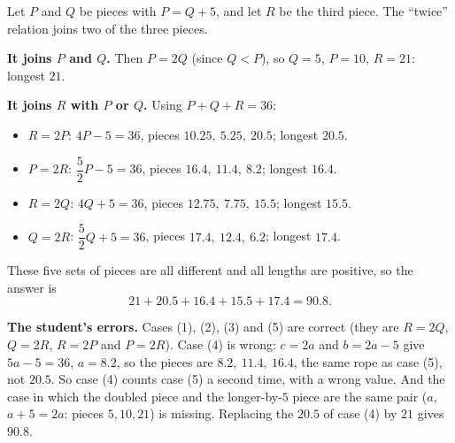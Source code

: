 Let $P$ and $Q$ be pieces with $P=Q+5$, and let $R$ be the third piece. The ``twice'' relation joins two of the three pieces.

\textbf{It joins $P$ and $Q$.} Then $P=2Q$ (since $Q<P$), so $Q=5$, $P=10$, $R=21$: longest $21$.

\textbf{It joins $R$ with $P$ or $Q$.} Using $P+Q+R=36$:
\begin{itemize}
\item $R=2P$: $4P-5=36$, pieces $10.25,\ 5.25,\ 20.5$; longest $20.5$.
\item $P=2R$: $\dfrac{5}{2}P-5=36$, pieces $16.4,\ 11.4,\ 8.2$; longest $16.4$.
\item $R=2Q$: $4Q+5=36$, pieces $12.75,\ 7.75,\ 15.5$; longest $15.5$.
\item $Q=2R$: $\dfrac{5}{2}Q+5=36$, pieces $17.4,\ 12.4,\ 6.2$; longest $17.4$.
\end{itemize}
These five sets of pieces are all different and all lengths are positive, so the answer is
\[
21+20.5+16.4+15.5+17.4=\boxed{90.8}.
\]

\textbf{The student's errors.} Cases (1), (2), (3) and (5) are correct (they are $R=2Q$, $Q=2R$, $R=2P$ and $P=2R$). Case (4) is wrong: $c=2a$ and $b=2a-5$ give $5a-5=36$, $a=8.2$, so the pieces are $8.2,\ 11.4,\ 16.4$, the same rope as case (5), not $20.5$. So case (4) counts case (5) a second time, with a wrong value. And the case in which the doubled piece and the longer-by-$5$ piece are the same pair ($a$, $a+5=2a$: pieces $5,10,21$) is missing. Replacing the $20.5$ of case (4) by $21$ gives $90.8$.
